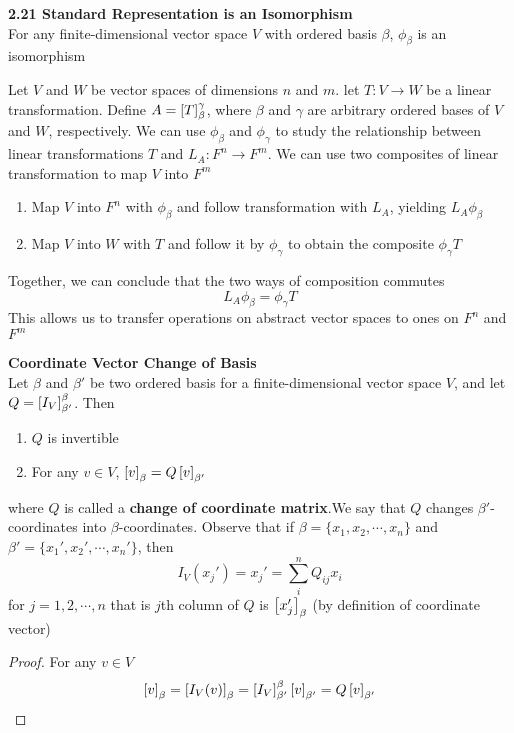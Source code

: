 \documentclass[11pt]{article}
\begin{document}
\begin{theorem*}
    \textbf{2.21 Standard Representation is an Isomorphism}\\
    For any finite-dimensional vector space $V$ with ordered basis $\beta$, $\phi_{\beta}$ is an isomorphism
\end{theorem*}


\begin{defn*}
    Let $V$ and $W$ be vector spaces of dimensions $n$ and $m$. let $T:V\to W$ be a linear transformation. Define $A=\left[ T \right]_{\beta}^{\gamma}$, where $\beta$ and $\gamma$ are arbitrary ordered bases of $V$ and $W$, respectively. We can use $\phi_{\beta}$ and $\phi_{\gamma}$ to study the relationship between linear transformations $T$ and $L_A:F^n \to F^m$. We can use two composites of linear transformation to map $V$ into $F^m$ 
    \begin{enumerate}
        \item Map $V$ into $F^n$ with $\phi_{\beta}$ and follow transformation with $L_A$, yielding $L_A \phi_{\beta}$ 
        \item Map $V$ into $W$ with $T$ and follow it by $\phi_{\gamma}$ to obtain the composite $\phi_{\gamma} T$ 
    \end{enumerate}
    Together, we can conclude that the two ways of composition commutes 
    \[
        L_A \phi_{\beta} = \phi_{\gamma} T
    \]
    This allows us to transfer operations on abstract vector spaces to ones on $F^n$ and $F^m$
\end{defn*}





\begin{theorem*}
    \textbf{Coordinate Vector Change of Basis} \\
    Let $\beta$ and $\beta'$ be two ordered basis for a finite-dimensional vector space $V$, and let $Q = \left[ I_V \right]_{\beta'}^{\beta}$. Then 
    \begin{enumerate}
        \item $Q$ is invertible 
        \item For any $v\in V$, $\left[ v \right]_{\beta} = Q\left[ v \right]_{\beta'}$
    \end{enumerate}
    where $Q$ is called a \textbf{change of coordinate matrix}.We say that $Q$ changes $\beta'$-coordinates into $\beta$-coordinates. Observe that if $\beta = \{x_1, x_2, \cdots, x_n\}$ and $\beta' = \{x_1', x_2', \cdots, x_n'\}$, then 
    \[
        I_V(x_j') = x_j' = \sum_i^n Q_{ij} x_i
    \]
    for $j = 1,2,\cdots, n$ that is $j$th column of $Q$ is $\left[ x_j' \right]_{\beta}$ (by definition of coordinate vector)
    \begin{proof}
        For any $v\in V$
        \[
            \left[ v \right]_{\beta} = \left[ I_V(v) \right]_{\beta} = \left[ I_V \right]_{\beta'}^{\beta} \left[ v \right]_{\beta'} = Q\left[ v \right]_{\beta'}
        \]
    \end{proof}
\end{theorem*}
\end{document}

